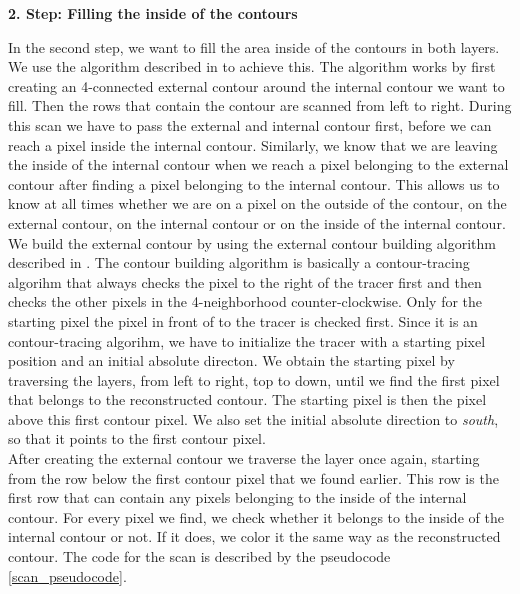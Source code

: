 \documentclass[thesis.tex]{subfiles}
\begin{document}
\textbf{2. Step: Filling the inside of the contours}

In the second step, we want to fill the area inside of the contours in both layers. We use the algorithm described in \cite{inside_contour} to achieve this. The algorithm works by first creating an 4-connected external contour around the internal contour we want to fill. Then the rows that contain the contour are scanned from left to right. During this scan we have to pass the external and internal contour first, before we can reach a pixel inside the internal contour. Similarly, we know that we are leaving the inside of the internal contour when we reach a pixel belonging to the external contour after finding a pixel belonging to the internal contour. This allows us to know at all times whether we are on a pixel on the outside of the contour, on the external contour, on the internal contour or on the inside of the internal contour. \\ 
We build the external contour by using the external contour building algorithm described in \cite{inside_contour}. The contour building algorithm is basically a contour-tracing algorihm that always checks the pixel to the right of the tracer first and then checks the other pixels in the 4-neighborhood counter-clockwise. Only for the starting pixel the pixel in front of to the tracer is checked first. Since it is an contour-tracing algorihm, we have to initialize the tracer with a starting pixel position and an initial absolute directon. We obtain the starting pixel by traversing the layers, from left to right, top to down, until we find the first pixel that belongs to the reconstructed contour. The starting pixel is then the pixel above this first contour pixel. We also set the initial absolute direction to \textit{south}, so that it points to the first contour pixel. \\
After creating the external contour we traverse the layer once again, starting from the row below the first contour pixel that we found earlier. This row is the first row that can contain any pixels belonging to the inside of the internal contour. For every pixel we find, we check whether it belongs to the inside of the internal contour or not. If it does, we color it the same way as the reconstructed contour. The code for the scan is described by the pseudocode \ref{scan_pseudocode}.
\end{document}
